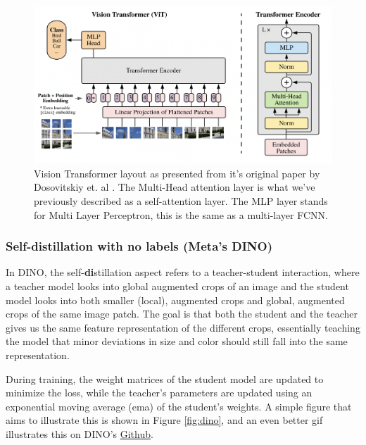 
\begin{figure}[H]
    \centering
    \includegraphics[width=1\linewidth]{examples/tests_eb/figs/vit.png}
    \caption{Vision Transformer layout as presented from it's original paper by Dosovitskiy et. al \cite{first_vit}. The Multi-Head attention layer is what we've previously described as a self-attention layer. The MLP layer stands for Multi Layer Perceptron, this is the same as a multi-layer FCNN.}
    \label{fig:ViT}
\end{figure}

\subsubsection{Self-\textbf{di}stillation with \textbf{no} labels (Meta's \textbf{DINO})} \label{sssec:dino}

In DINO, the self-\textbf{di}stillation aspect refers to a teacher-student interaction, where a teacher model looks into global augmented crops of an image and the student model looks into both smaller (local), augmented crops and global, augmented crops of the same image patch. The goal is that both the student and the teacher gives us the same feature representation of the different crops, essentially teaching the model that minor deviations in size and color should still fall into the same representation. 

During training, the weight matrices of the student model are updated to minimize the loss, while the teacher’s parameters are updated using an exponential moving average (ema) of the student’s weights. A simple figure that aims to illustrate this is shown in Figure \ref{fig:dino}, and an even better gif illustrates this on DINO's \hyperlink{https://github.com/facebookresearch/dino}{Github}.

